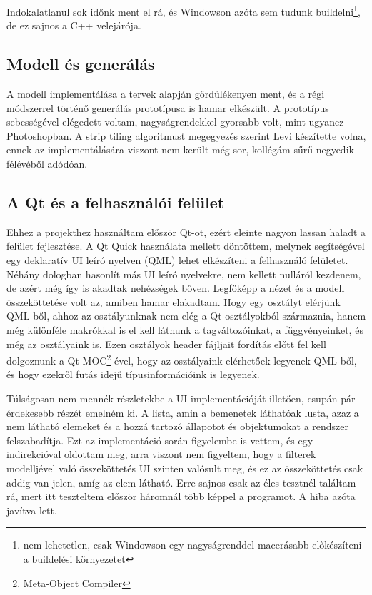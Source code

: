 Indokalatlanul sok időnk ment el rá, és Windowson azóta sem tudunk buildelni\footnote{nem lehetetlen, csak Windowson egy nagyságrenddel macerásabb előkészíteni a buildelési környezetet}, de ez sajnos a C++ velejárója.

\subsection{Modell és generálás}

A modell implementálása a tervek alapján gördülékenyen ment, és a régi módszerrel történő generálás prototípusa is hamar elkészült. A prototípus sebességével elégedett voltam, nagyságrendekkel gyorsabb volt, mint ugyanez Photoshopban. A strip tiling algoritmust megegyezés szerint Levi készítette volna, ennek az implementálására viszont nem került még sor, kollégám sűrű negyedik félévéből adódóan.

\subsection{A Qt és a felhasználói felület}

Ehhez a projekthez használtam először Qt-ot, ezért eleinte nagyon lassan haladt a felület fejlesztése. A Qt Quick használata mellett döntöttem, melynek segítségével egy deklaratív UI leíró nyelven (\href{https://en.wikipedia.org/wiki/QML}{QML}) lehet elkészíteni a felhasználó felületet. Néhány dologban hasonlít más UI leíró nyelvekre, nem kellett nulláról kezdenem, de azért még így is akadtak nehézségek bőven. Legfőképp a nézet és a modell összeköttetése volt az, amiben hamar elakadtam. Hogy egy osztályt elérjünk QML-ből, ahhoz az osztályunknak nem elég a Qt osztályokból származnia, hanem még különféle makrókkal is el kell látnunk a tagváltozóinkat, a függvényeinket, és még az osztályaink is. Ezen osztályok header fájljait fordítás előtt fel kell dolgoznunk a Qt MOC\footnote{Meta-Object Compiler}-ével, hogy az osztályaink elérhetőek legyenek QML-ből, és hogy ezekről futás idejű típusinformációink is legyenek. 

Túlságosan nem mennék részletekbe a UI implementációját illetően, csupán pár érdekesebb részét emelném ki. A lista, amin a bemenetek láthatóak lusta, azaz a nem látható elemeket és a hozzá tartozó állapotot és objektumokat a rendszer felszabadítja. Ezt az implementáció során figyelembe is vettem, és egy indirekcióval oldottam meg, arra viszont nem figyeltem, hogy a filterek modelljével való összeköttetés UI szinten valósult meg, és ez az összeköttetés csak addig van jelen, amíg az elem látható. Erre sajnos csak az éles tesztnél találtam rá, mert itt teszteltem először háromnál több képpel a programot. A hiba azóta javítva lett.

